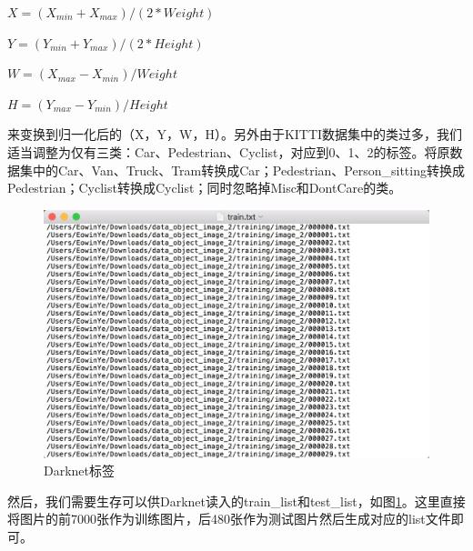 {	$X = (X_{min} + X_{max}) / (2 * Weight)$

	$Y = (Y_{min} + Y_{max}) / (2 * Height)$

	$W = (X_{max} - X_{min}) / Weight$

	$H = (Y_{max} - Y_{min}) / Height$

	来变换到归一化后的（X，Y，W，H）。另外由于KITTI数据集中的类过多，我们适当调整为仅有三类：Car、Pedestrian、Cyclist，对应到0、1、2的标签。将原数据集中的Car、Van、Truck、Tram转换成Car；Pedestrian、Person\_sitting转换成Pedestrian；Cyclist转换成Cyclist；同时忽略掉Misc和DontCare的类。

	\begin{figure}[htbp]
	\centering
	\includegraphics[width=5in]{images/trainList.png}
	\caption{Darknet标签}
	\label{trainList}
	\end{figure}
	然后，我们需要生存可以供Darknet读入的train\_list和test\_list，如图\ref{trainList}。这里直接将图片的前7000张作为训练图片，后480张作为测试图片然后生成对应的list文件即可。
}

